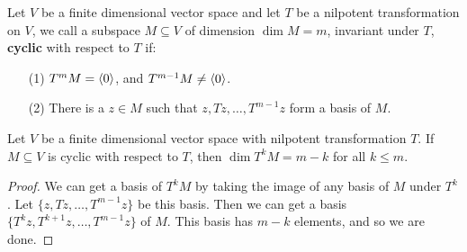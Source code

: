 \begin{definition}
    Let $V$ be a finite dimensional vector space and let  $T$ be a nilpotent
    transformation on $V$, we call a subspace  $M \subseteq V$ of dimension
    $\dim{M}=m$, invariant under $T$, \textbf{cyclic} with respect to $T$ if:
    \begin{enumerate}
        \item[(1)] $T^mM=\langle 0\rangle$, and  $T^{m-1}M \neq \langle 0\rangle$.

        \item[(2)] There is a $z \in M$ such that  $z, Tz, \dots, T^{m-1}z$
            form a basis of $M$.
    \end{enumerate}
\end{definition}

\begin{lemma}\label{3.4.13}
    Let $V$ be a finite dimensional vector space with nilpotent transformation
     $T$. If  $M \subseteq V$ is cyclic with respect to  $T$, then
     $\dim{T^kM}=m-k$ for all $k \leq m$.
\end{lemma}
\begin{proof}
    We can get a basis of $T^kM$ by taking the image of any basis of  $M$ under
     $T^k$. Let  $\{z, Tz, \dots, T^{m-1}z\}$ be this basis. Then we can get a
     basis $\{T^kz, T^{k+1}z, \dots, T^{m-1}z\}$ of $M$. This basis has  $m-k$
     elements, and so we are done.
\end{proof}

